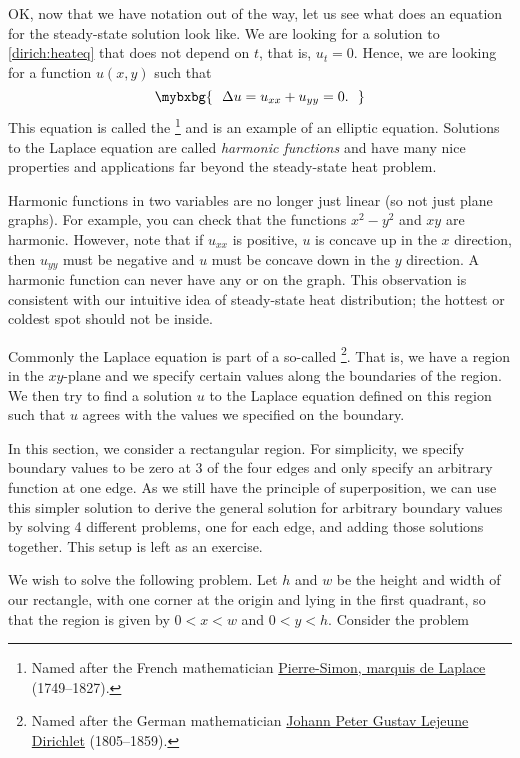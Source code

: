 OK\@, now that we have notation out of the way, let us see what does an equation
for the steady-state solution look like.  We are looking for a solution to
\eqref{dirich:heateq} that does not depend on $t$, that is,
$u_t = 0$.
Hence, we are looking for a
function $u(x,y)$ such that
\begin{equation*}
\mybxbg{~~
\Delta u = 
u_{xx} + u_{yy} = 0 .
~~}
\end{equation*}
This equation is called the \emph{}%
\footnote{Named after the French mathematician
\href{https://en.wikipedia.org/wiki/Laplace}{Pierre-Simon, marquis de Laplace}
(1749--1827).} and is an example of an elliptic equation.
Solutions to the Laplace equation
are called \emph{harmonic functions}
and have many nice properties and
applications far beyond the steady-state heat problem.

Harmonic functions in two variables are no longer just linear
(so not just plane graphs).  For example, you can check that the functions
$x^2-y^2$ and $xy$ are harmonic.  However, note that if $u_{xx}$ is positive, $u$ is concave
up in the $x$ direction, then $u_{yy}$ must be negative and $u$ must be
concave down in the $y$ direction.  A harmonic function can never
have any  or  on the graph.  This observation is
consistent with our intuitive idea of steady-state heat distribution;
the hottest or coldest spot should not be inside.

Commonly the Laplace equation is part of a so-called
\emph{}%
\footnote{Named after the German mathematician
\href{https://en.wikipedia.org/wiki/Dirichlet}{Johann Peter Gustav Lejeune Dirichlet}
(1805--1859).}.
That
is, we have a region in the $xy$-plane and we specify certain values along
the boundaries of the region.  We then try to find a solution $u$ to the
Laplace equation defined on
this region such that $u$ agrees with the values we specified on the
boundary.

In this section, we consider a rectangular region.  For simplicity,
we specify boundary values to be zero at 3 of the four edges and only
specify an arbitrary function at one edge.  As we still have the
principle of superposition, we can use this simpler
solution to derive the general
solution for arbitrary boundary values by solving 4 different problems,
one for each edge, and adding those solutions together.
This setup is left as an exercise.

We wish to solve the following problem.  Let $h$ and $w$
be the height and width of our rectangle, with one corner at the origin and
lying in the first quadrant, so that the region is
given by $0 < x < w$ and $0 < y < h$.
Consider the problem

